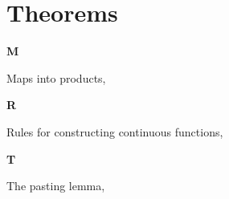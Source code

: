 \section*{Theorems}

\vspace{1em}\noindent\large{\textbf{M}}

Maps into products, \pageref{theorem:MapsIntoProducts}

\vspace{1em}\noindent\large{\textbf{R}}

Rules for constructing continuous functions, \pageref{theorem:RulesForConstructingContinuousFunctions}

\vspace{1em}\noindent\large{\textbf{T}}

The pasting lemma, \pageref{theorem:ThePastingLemma}

